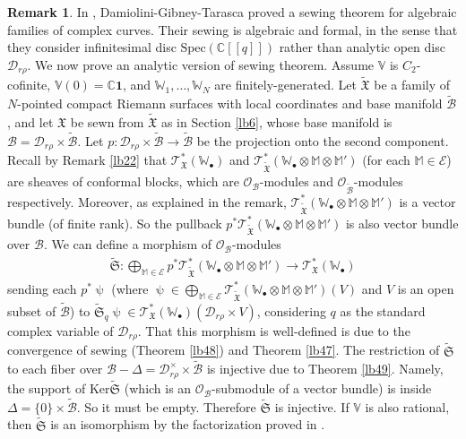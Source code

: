 \documentclass[12pt,a4paper,notitlepage]{article}
\theoremstyle{definition}
\newtheorem{rem}[df]{Remark}
\theoremstyle{plain}
\newcommand{\fk}{\mathfrak}
\newcommand{\mc}{\mathcal}
\newcommand{\wtd}{\widetilde}
\newcommand{\id}{\mathbf{1}}
\newcommand{\scr}{\mathscr}
\newcommand{\blt}{\bullet}
\newcommand{\Vbb}{\mathbb V}
\newcommand{\Wbb}{\mathbb W}
\newcommand{\Mbb}{\mathbb M}
\newcommand{\Cbb}{\mathbb C}
\newcommand{\Ker}{\mathrm{Ker}}
\numberwithin{equation}{section}
\begin{document}
\begin{rem}\label{lb57}
In \cite[Thm. 8.5.1]{DGT19b}, Damiolini-Gibney-Tarasca proved a  sewing theorem for algebraic families of complex curves. Their sewing is algebraic and formal, in the sense that they consider infinitesimal disc $\mathrm{Spec}(\Cbb[[q]])$ rather than analytic open disc $\mc D_{r\rho}$. We now prove an analytic version of sewing theorem. Assume $\Vbb$ is $C_2$-cofinite, $\Vbb(0)=\Cbb\id$, and $\Wbb_1,\dots,\Wbb_N$ are finitely-generated. Let $\wtd{\fk X}$ be a family of $N$-pointed compact Riemann surfaces with local coordinates and base manifold $\wtd{\mc B}$, and let $\fk X$ be sewn from $\wtd{\fk X}$ as in Section \ref{lb6}, whose base manifold is $\mc B=\mc D_{r\rho}\times\wtd{\mc B}$. Let $p:\mc D_{r\rho}\times\wtd{\mc B}\rightarrow \wtd{\mc B}$ be the projection onto the second component.  Recall by Remark \ref{lb22} that $\scr T_{\fk X}^*(\Wbb_\blt)$ and $\scr T_{\wtd{\fk X}}^*(\Wbb_\blt\otimes\Mbb\otimes\Mbb')$ (for each $\Mbb\in\mc E$) are sheaves of conformal blocks, which are $\scr O_{\mc B}$-modules and $\scr O_{\wtd{\mc B}}$-modules respectively. Moreover, as explained in the remark, $\scr T_{\wtd{\fk X}}^*(\Wbb_\blt\otimes\Mbb\otimes\Mbb')$ is a vector bundle (of finite rank). So the pullback $p^*\scr T_{\wtd{\fk X}}^*(\Wbb_\blt\otimes\Mbb\otimes\Mbb')$ is also vector bundle over $\mc B$. We can define a morphism of $\scr O_{\mc B}$-modules
\begin{gather*}
\wtd{\fk S}: \bigoplus_{\Mbb\in\mc E}p^*\scr T_{\wtd{\fk X}}^*(\Wbb_\blt\otimes\Mbb\otimes\Mbb')\rightarrow  \scr T_{\fk X}^*(\Wbb_\blt)
\end{gather*}
sending each $p^*\uppsi$ (where $\uppsi\in \bigoplus_{\Mbb\in\mc E}\scr T_{\wtd{\fk X}}^*(\Wbb_\blt\otimes\Mbb\otimes\Mbb')(V)$ and $V$ is an open subset of $\wtd{\mc B}$) to $\wtd{\fk S}_q\uppsi\in\scr T_{\fk X}^*(\Wbb_\blt)(\mc D_{r\rho}\times V)$, considering $q$ as the standard complex variable of $\mc D_{r\rho}$. That this morphism is well-defined is due to the convergence of sewing (Theorem \ref{lb48}) and Theorem \ref{lb47}. The restriction of $\wtd{\fk S}$ to each fiber over $\mc B-\Delta=\mc D_{r\rho}^\times\times\wtd{\mc B}$ is injective due to Theorem \ref{lb49}. Namely, the support of  $\Ker\wtd{\fk S}$ (which is an $\scr O_{\mc B}$-submodule of a vector bundle) is inside $\Delta=\{0\}\times\wtd{\mc B}$. So it must be empty. Therefore $\wtd{\fk S}$ is injective. If $\Vbb$ is also rational, then $\wtd{\fk S}$ is an isomorphism by the factorization proved in \cite{DGT19b}.
\end{rem}
\end{document}
